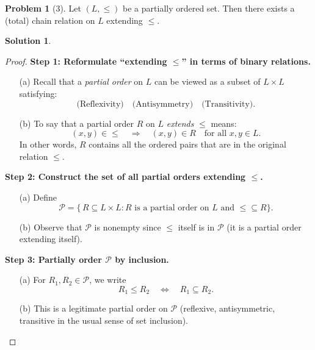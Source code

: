 \documentclass[12pt]{article}
\theoremstyle{definition} %
\newtheorem{solution}{Solution}
\newtheorem{problem}{Problem}
\theoremstyle{plain} %
\begin{document}
\begin{problem}[3]
    Let $(L,\leq)$ be a partially ordered set. Then there exists a (total) chain relation on $L$ extending $\leq$. 
\end{problem}
\begin{solution}

        \begin{proof}
        \textbf{Step 1: Reformulate ``extending $\leq$'' in terms of binary relations.}
        
        \begin{enumerate}
            \item[(a)] Recall that a \emph{partial order} on $L$ can be viewed as a subset of $L \times L$ satisfying:
            \[
              \text{(Reflexivity)} \quad
              \text{(Antisymmetry)} \quad
              \text{(Transitivity)}.
            \]
            \item[(b)] To say that a partial order $R$ on $L$ \emph{extends} $\leq$ means:
            \[
               (x,y) \in \leq \quad \Longrightarrow \quad (x,y) \in R 
               \quad \text{for all } x,y \in L.
            \]
            In other words, $R$ contains all the ordered pairs that are in the original relation $\leq$.
        \end{enumerate}
        
        \vspace{0.3cm}
        \textbf{Step 2: Construct the set of all partial orders extending $\leq$.}
        
        \begin{enumerate}
            \item[(a)] Define
            \[
                \mathcal{P} = \{\, R \subseteq L \times L : R \text{ is a partial order on } L \text{ and } \leq \subseteq R \}.
            \]
            \item[(b)] Observe that $\mathcal{P}$ is nonempty since $\leq$ itself is in $\mathcal{P}$ (it is a partial order extending itself).
        \end{enumerate}
        
        \vspace{0.3cm}
        \textbf{Step 3: Partially order $\mathcal{P}$ by inclusion.}
        
        \begin{enumerate}
            \item[(a)] For $R_1, R_2 \in \mathcal{P}$, we write 
            \[
               R_1 \leq R_2 \quad \Longleftrightarrow \quad R_1 \subseteq R_2.
            \]
            \item[(b)] This is a legitimate partial order on $\mathcal{P}$ (reflexive, antisymmetric, transitive in the usual sense of set inclusion).
        \end{enumerate}
        

\end{proof}
\end{solution}
\end{document}
